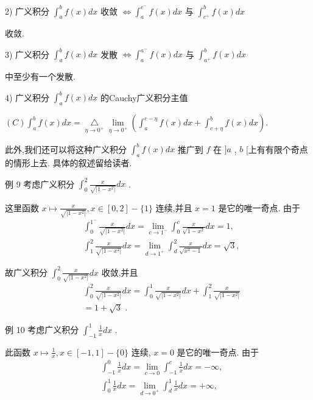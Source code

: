 2) 广义积分 ${\int }_{a}^{b}f\left( x\right) {dx}$ 收敛 $\Leftrightarrow  {\int }_{a}^{{c}^{ - }}f\left( x\right) {dx}$ 与 ${\int }_{{c}^{ + }}^{b}f\left( x\right) {dx}$

收敛.

3) 广义积分 ${\int }_{a}^{b}f\left( x\right) {dx}$ 发散 $\Leftrightarrow  {\int }_{a}^{{a}^{ - }}f\left( x\right) {dx}$ 与 ${\int }_{{a}^{ + }}^{b}f\left( x\right) {dx}$

中至少有一个发散.

4) 广义积分 ${\int }_{a}^{b}f\left( x\right) {dx}$ 的Cauchy广义积分主值

$\left( C\right) {\int }_{a}^{b}f\left( x\right) {dx} = \underset{\eta  \rightarrow  {0}^{ + }}{ \bigtriangleup  }\mathop{\lim }\limits_{{\eta  \rightarrow  {0}^{ + }}}\left( {{\int }_{a}^{c - \eta }f\left( x\right) {dx} + {\int }_{c + \eta }^{b}f\left( x\right) {dx}}\right) .$

此外,我们还可以将这种广义积分 ${\int }_{a}^{b}f\left( x\right) {dx}$ 推广到 $f$ 在 $\rbrack a$ , $b$ [上有有限个奇点的情形上去. 具体的叙述留给读者.

例 9 考虑广义积分 ${\int }_{0}^{2}\frac{x}{\sqrt{\left| 1 - {x}^{2}\right| }}{dx}$ .

这里函数 $x \mapsto  \frac{x}{\sqrt{\left| 1 - {x}^{2}\right| }},x \in  \left\lbrack  {0,2}\right\rbrack   - \{ 1\}$ 连续,并且 $x = 1$ 是它的唯一奇点. 由于
\begin{align*}
	&{\int }_{0}^{{1}^{ - }}\frac{x}{\sqrt{\left| 1 - {x}^{2}\right| }}{dx} = \mathop{\lim }\limits_{{c \rightarrow  {1}^{ - }}}{\int }_{0}^{c}\frac{x}{\sqrt{1 - {x}^{2}}}{dx} = 1,\\
	&{\int }_{1}^{2}\frac{x}{\sqrt{\left| 1 - {x}^{2}\right| }}{dx} = \mathop{\lim }\limits_{{d \rightarrow  {1}^{ + }}}{\int }_{d}^{2}\frac{x}{\sqrt{{x}^{2} - 1}}{dx} = \sqrt{3},
\end{align*}

故广义积分 ${\int }_{0}^{2}\frac{x}{\sqrt{\left| 1 - {x}^{2}\right| }}{dx}$ 收敛,并且
\begin{align*}
	&{\int }_{0}^{2}\frac{x}{\sqrt{\left| 1 - {x}^{2}\right| }}{dx} = {\int }_{0}^{1}\frac{x}{\sqrt{\left| 1 - {x}^{2}\right| }}{dx} + {\int }_{1}^{2}\frac{x}{\sqrt{\left| 1 - {x}^{2}\right| }}\\
	&= 1 + \sqrt{3}\text{ . }
\end{align*}

例 10 考虑广义积分 ${\int }_{-1}^{1}\frac{1}{x}{dx}$ .

此函数 $x \mapsto  \frac{1}{x},x \in  \left\lbrack  {-1,1}\right\rbrack   - \{ 0\}$ 连续, $x = 0$ 是它的唯一奇点. 由于
\begin{align*}
	&{\int }_{-1}^{0}\frac{1}{x}{dx} = \mathop{\lim }\limits_{{c \rightarrow  0}}{\int }_{-1}^{c}\frac{1}{x}{dx} =  - \infty ,\\
	&{\int }_{0}^{1}\frac{1}{x}{dx} = \mathop{\lim }\limits_{{d \rightarrow  {0}^{ + }}}{\int }_{d}^{1}\frac{1}{x}{dx} =  + \infty ,
\end{align*}

